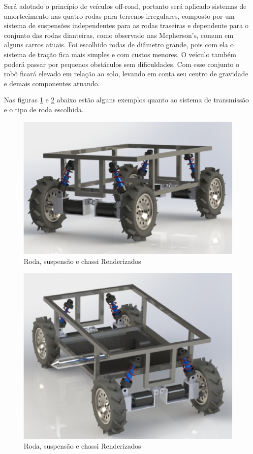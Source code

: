       Será adotado o princípio de veículos off-road, portanto será aplicado sistemas de amortecimento nas quatro rodas para terrenos 
      irregulares, composto por um sistema de suspensões independentes para as rodas traseiras e dependente para o conjunto das 
      rodas dianteiras, como observado nas Mcpherson's, comum em alguns carros atuais. Foi escolhido rodas de diâmetro grande, 
      pois com ela o sistema de tração fica mais simples e com custos menores. O veículo também poderá passar por pequenos 
      obstáculos sem dificuldades. Com esse conjunto o robô ficará elevado em relação ao solo, levando em conta seu centro 
      de gravidade e demais componentes atuando.
      
      Nas figuras \ref{SUSPENTION01} e \ref{SUSPENTION02} abaixo estão alguns exemplos quanto ao sistema de transmissão e o tipo de roda escolhida. 
      
      \begin{figure}[!htbp]
	\centering
	\label{SUSPENTION01}
	  \includegraphics[keepaspectratio=true,scale=0.5]{figuras/suspention01.eps}
	\caption{Roda, suspensão e chassi Renderizados}
      \end{figure}
      
      \begin{figure}[!htbp]
	\centering
	\label{SUSPENTION02}
	  \includegraphics[keepaspectratio=true,scale=0.5]{figuras/suspention02.eps}
	\caption{Roda, suspensão e chassi Renderizados}
      \end{figure}
      
